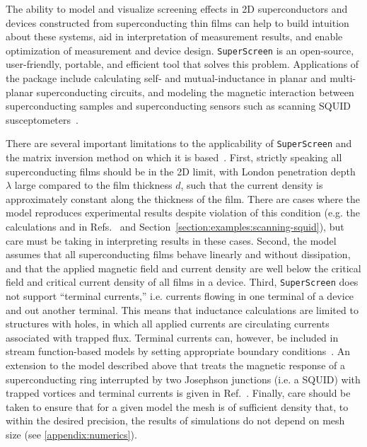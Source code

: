 \documentclass[final,3p,times,twocolumn]{elsarticle}
\newcommand{\inline}[1]{\texttt{#1}\xspace}
\newcommand{\SuperScreen}{\inline{SuperScreen}}
\begin{document}
The ability to model and visualize screening effects in 2D superconductors and devices constructed from superconducting thin films can help to build intuition about these systems, aid in interpretation of measurement results, and enable optimization of measurement and device design. \SuperScreen is an open-source, user-friendly, portable, and efficient tool that solves this problem. Applications of the package include calculating self- and mutual-inductance in planar and multi-planar superconducting circuits, and modeling the magnetic interaction between superconducting samples and superconducting sensors such as scanning SQUID susceptometers~\cite{Kirtley2016-zz}.

There are several important limitations to the applicability of \SuperScreen and the matrix inversion method on which it is based~\cite{Brandt2004-ew,Brandt2005-wj}. First, strictly speaking all superconducting films should be in the 2D limit, with London penetration depth $\lambda$ large compared to the film thickness $d$, such that the current density is approximately constant along the thickness of the film. There are cases where the model reproduces experimental results despite violation of this condition (e.g. the calculations and in Refs.~\cite{Kirtley2016-zz,Kirtley2016-gt} and Section~\ref{section:examples:scanning-squid}), but care must be taking in interpreting results in these cases. Second, the model assumes that all superconducting films behave linearly and without dissipation, and that the applied magnetic field and current density are well below the critical field and critical current density of all films in a device. Third, \SuperScreen does not support ``terminal currents,'' i.e. currents flowing in one terminal of a device and out another terminal. This means that inductance calculations are limited to structures with holes, in which all applied currents are circulating currents associated with trapped flux. Terminal currents can, however, be included in stream function-based models by setting appropriate boundary conditions~\cite{Khapaev1997-kw,Khapaev2001-xq,Khapaev2001-pw, Khapaev2002-ev, Muller2021-ci}. An extension to the model described above that treats the magnetic response of a superconducting ring interrupted by two Josephson junctions (i.e. a SQUID) with trapped vortices and terminal currents is given in Ref.~\cite{Clem2005-ye}. Finally, care should be taken to ensure that for a given model the mesh is of sufficient density that, to within the desired precision, the results of simulations do not depend on mesh size (see \ref{appendix:numerics}).
\end{document}
